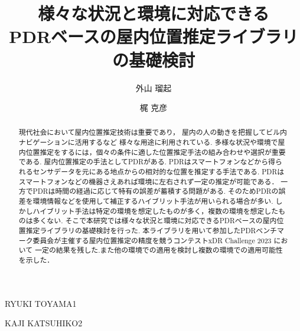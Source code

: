 \documentclass[Japanese]{dicomopapers}
\begin{document}
\title{様々な状況と環境に対応できる\\PDRベースの屋内位置推定ライブラリの基礎検討}



\author{外山 瑠起}{RYUKI TOYAMA}{1}
\author{梶 克彦}{KAJI KATSUHIKO}{2}



\begin{abstract}
	現代社会において屋内位置推定技術は重要であり，
	屋内の人の動きを把握してビル内ナビゲーションに活用するなど
	様々な用途に利用されている.
	多様な状況や環境で屋内位置推定をするには，個々の条件に適した位置推定手法の組み合わせや選択が重要である.
	屋内位置推定の手法としてPDRがある.
	PDRはスマートフォンなどから得られるセンサデータを元にある地点からの相対的な位置を推定する手法である.
	PDRはスマートフォンなどの機器さえあれば環境に左右されず一定の推定が可能である．
	一方でPDRは時間の経過に応じて特有の誤差が蓄積する問題がある.
	そのためPDRの誤差を環境情報などを使用して補正するハイブリット手法が用いられる場合が多い.
	しかしハイブリット手法は特定の環境を想定したものが多く，複数の環境を想定したものは多くない.
	そこで本研究では様々な状況と環境に対応できるPDRベースの屋内位置推定ライブラリの基礎検討を行った.
	本ライブラリを用いて参加したPDRベンチマーク委員会が主催する屋内位置推定の精度を競うコンテストxDR Challenge 2023 において
	一定の結果を残した.また他の環境での適用を検討し複数の環境での適用可能性を示した．
\end{abstract}

\maketitle




















\end{document}
